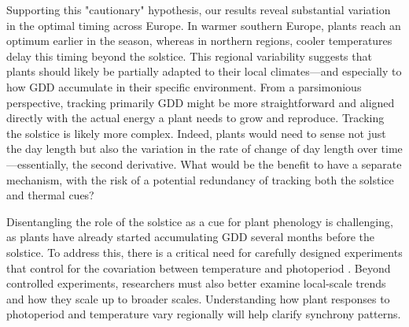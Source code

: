 \documentclass[11pt,letter]{article}
\begin{document}
Supporting this "cautionary" hypothesis, our results reveal substantial variation in the optimal timing across Europe. In warmer southern Europe, plants reach an optimum earlier in the season, whereas in northern regions, cooler temperatures delay this timing beyond the solstice. 
This regional variability suggests that plants should likely be partially adapted to their local climates---and especially to how GDD accumulate in their specific environment.
From a parsimonious perspective, tracking primarily GDD might be more straightforward and aligned directly with the actual energy a plant needs to grow and reproduce. %
Tracking the solstice is likely more complex. Indeed, plants would need to sense not just the day length but also the variation in the rate of change of day length over time---essentially, the second derivative.
What would be the benefit to have a separate mechanism, with the risk of a potential redundancy of tracking both the solstice and thermal cues?



Disentangling the role of the solstice as a cue for plant phenology is challenging, as plants have already started accumulating GDD several months before the solstice.
To address this, there is a critical need for carefully designed experiments that control for the covariation between temperature and photoperiod  \citep{Buonaiuto2023}.
Beyond controlled experiments, researchers must also better examine local-scale trends and how they scale up to broader scales. Understanding how plant responses to photoperiod and temperature vary regionally will help clarify synchrony patterns.
\end{document}
